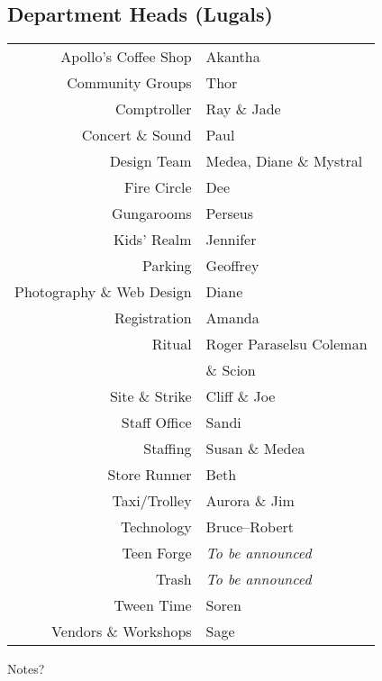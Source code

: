 \documentclass[9pt,twoside,openright,final,article,letterpaper]{memoir}
\let\oldsubsection=\subsection
\renewcommand{\subsection}[1]{%
  \vspace{6pt}
  \needspace{1.25in}
  \oldsubsection{#1}
  \nopagebreak}
\begin{document}
\begin{multicols}{2}
  \subsection{Department Heads (Lugals)}
  \begin{center}
    \begin{tabular}{rl}
      Apollo’s Coffee Shop & Akantha \\ 
      Community Groups     & Thor \\ 
      Comptroller          & Ray \& Jade \\
      Concert \& Sound     & Paul \\ 
      Design Team          & Medea, Diane \& Mystral \\ 
      Fire Circle          & Dee \\ 
      Gungarooms           & Perseus \\ 
      Kids’ Realm          & Jennifer \\ 
      Parking              & Geoffrey \\ 
      Photography \& Web Design & Diane \\ 
      Registration         & Amanda \\ 
      Ritual               & Roger Paraselsu Coleman \\
                           & \& Scion \\ 
      Site \& Strike       & Cliff \& Joe \\ 
      Staff Office         & Sandi \\ 
      Staffing             & Susan \& Medea \\ 
      Store Runner         & Beth \\ 
      Taxi/Trolley         & Aurora \& Jim \\ 
      Technology           & Bruce–Robert \\ 
      Teen Forge           & \textit{To be announced} \\ 
      Trash                & \textit{To be announced} \\ 
      Tween Time           & Soren \\ 
      Vendors \& Workshops & Sage \\ 
    \end{tabular} 
  \end{center}
\end{multicols}

\vfill

{\hminfamily\Large Notes?}
\end{document}
